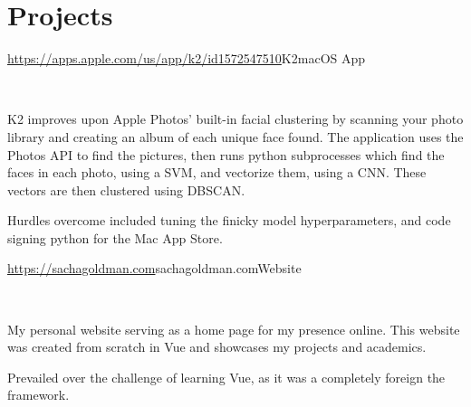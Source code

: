 \documentclass[]{style}
\begin{document}

\section{Projects}

\begin{entrylist}


\vspace{2mm}

\entry
{\url{https://apps.apple.com/us/app/k2/id1572547510}{K2}}{macOS App}
{ ~ \vspace{-2.5mm}

   

K2 improves upon Apple Photos' built-in facial clustering by scanning your photo library and creating an album of each unique face found. The application uses the Photos API to find the pictures, then runs python subprocesses which find the faces in each photo, using a SVM, and vectorize them, using a CNN. These vectors are then clustered using DBSCAN.
\vspace{1mm}

Hurdles overcome included tuning the finicky model hyperparameters, and code signing python for the Mac App Store.}


\vspace{2mm}

\entry
{\url{https://sachagoldman.com}{sachagoldman.com}}{Website}
{ ~ \vspace{-2.5mm}

 

My personal website serving as a home page for my presence online. This website was created from scratch in Vue and showcases my projects and academics. 
\vspace{1mm}

Prevailed over the challenge of learning Vue, as it was a completely foreign the framework.}



%
%


\end{entrylist}
\end{document}
